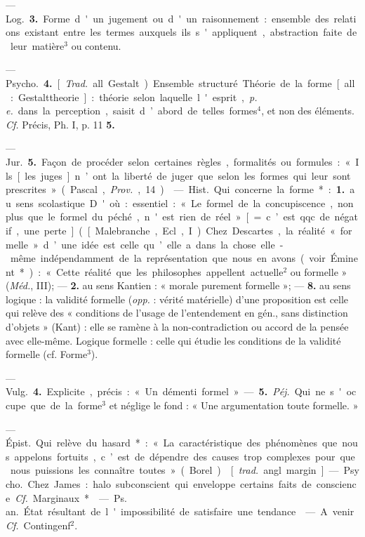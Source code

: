 \begin{itemize}[leftmargin=1cm, label=, itemsep=1pt]
— \si{Log.} {\bf 3.} Forme d'un jugement
ou d'un raisonnement : ensemble des
relations existant entre les termes
auxquels ils s'appliquent, abstraction faite de leur matière$^3$ ou contenu.

— \si{Psycho.} {\bf 4.} [{\it Trad.} all. Gestalt).
Ensemble structuré. Théorie de la
forme [all. : Gestalttheorie] : théorie selon laquelle l'esprit, {\it p. e.} dans
la perception, saisit d’abord de
telles formes$^4$, et non des éléments.
{\it Cf.} Précis, Ph. I, p. 11 {\bf 5.}

— \si{Jur.} {\bf 5.} Façon de procéder
selon certaines règles, formalités ou
formules : « Ils [les juges] n’ont la
liberté de juger que selon les formes
qui leur sont prescrites » (Pascal,
{\it Prov.}, 14).

 — \si{Hist.} Qui concerne la
forme* : {\bf 1.} au sens scolastique. D'où :
essentiel : « Le formel de la concupiscence, non plus que le formel du
péché, n'est rien de réel » [= c’est
qqc. de négatif, une perte] ([Malebranche, Ecl., I). Chez Descartes, la
réalité « formelle » d’une idée est celle
qu’elle a dans la chose elle-même
indépendamment de la représentation que nous en avons (voir Éminent*) : « Cette réalité que les philosophes appellent actuelle$^2$ ou formelle » (\si{{\it Méd.}}, III); — {\bf 2.} au sens
Kantien : « morale purement formelle »; — {\bf 8.} au sens logique : la
validité formelle ({\it opp.} : vérité matérielle) d’une proposition est celle
qui relève des « conditions de l’usage
de l’entendement en gén., sans distinction d'objets » (Kant) : elle se
ramène à la non-contradiction ou
accord de la pensée avec elle-même.
Logique formelle : celle qui étudie
les conditions de la validité formelle (cf. Forme$^3$).

— \si{Vulg.} {\bf 4.} Explicite, précis :« Un
démenti formel ». — {\bf 5.} {\it Péj.} Qui ne
s'occupe que de la forme$^3$ et néglige
le fond : « Une argumentation toute
formelle. »

 — \si{Épist.} Qui relève du
hasard* : « La caractéristique des
phénomènes que nous appelons
fortuits, c’est de dépendre des
causes trop complexes pour que
nous puissions les connaître toutes »
(Borel).

 [{\it trad.} angl. margin]. — \si{Psycho.}
Chez James : halo subconscient qui
enveloppe certains faits de conscience. {\it Cf.} Marginaux*.

 — \si{Ps. an.} État résultant
de l'impossibilité de satisfaire une
tendance.

 — A venir. {\it Cf.} Contingenf$^2$.

	\end{itemize}
